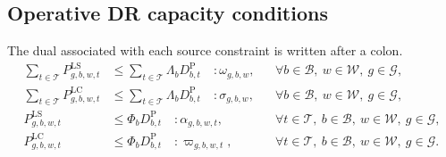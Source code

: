 \documentclass{article}
\begin{document}
\subsection*{Operative DR capacity conditions}
The dual associated with each source constraint is written after a colon.
\begin{align}
\sum_{t\in\mathcal T}P^{\mathrm{LS}}_{g,b,w,t}
&\leq\sum_{t\in\mathcal T}\Lambda_bD^{\mathrm P}_{b,t}
\quad:\omega_{g,b,w},
&&\forall b\in\mathcal B,\ w\in\mathcal W,\ g\in\mathcal G,\tag{37}\\
\sum_{t\in\mathcal T}P^{\mathrm{LC}}_{g,b,w,t}
&\leq\sum_{t\in\mathcal T}\Lambda_bD^{\mathrm P}_{b,t}
\quad:\sigma_{g,b,w},
&&\forall b\in\mathcal B,\ w\in\mathcal W,\ g\in\mathcal G,\tag{38}\\
P^{\mathrm{LS}}_{g,b,w,t}&\leq\Phi_bD^{\mathrm P}_{b,t}
\quad:\alpha_{g,b,w,t},
&&\forall t\in\mathcal T,\ b\in\mathcal B,\ w\in\mathcal W,\ g\in\mathcal G,\tag{39}\\
P^{\mathrm{LC}}_{g,b,w,t}&\leq\Phi_bD^{\mathrm P}_{b,t}
\quad:\varpi_{g,b,w,t},
&&\forall t\in\mathcal T,\ b\in\mathcal B,\ w\in\mathcal W,\ g\in\mathcal G.\tag{40}
\end{align}
\end{document}
